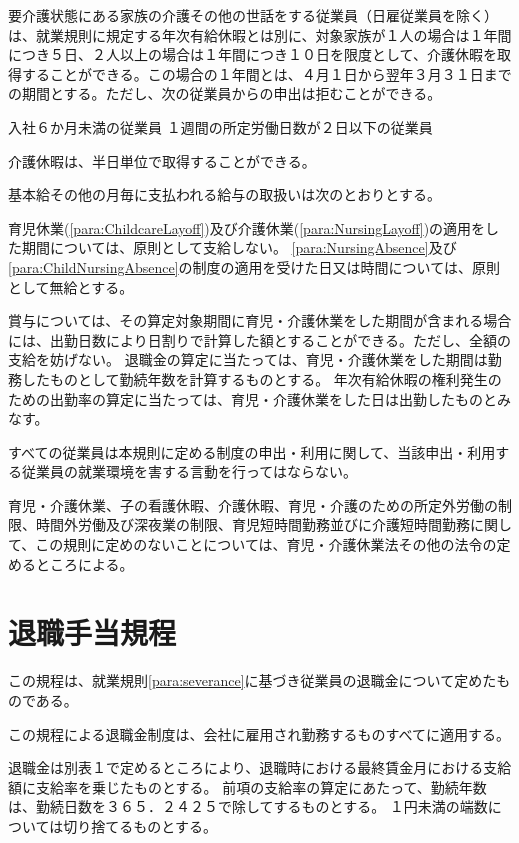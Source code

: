 \documentclass[10pt,a4paper,uplatex]{jsarticle}
\begin{document}
要介護状態にある家族の介護その他の世話をする従業員（日雇従業員を除く）は、就業規則に規定する年次有給休暇とは別に、対象家族が１人の場合は１年間につき５日、２人以上の場合は１年間につき１０日を限度として、介護休暇を取得することができる。この場合の１年間とは、４月１日から翌年３月３１日までの期間とする。ただし、次の従業員からの申出は拒むことができる。
\label{para:NursingAbsence}
\begin{enumerate}
    \itm 入社６か月未満の従業員
    \itm １週間の所定労働日数が２日以下の従業員
\end{enumerate}
\term 介護休暇は、半日単位で取得することができる。

基本給その他の月毎に支払われる給与の取扱いは次のとおりとする。
\begin{enumerate}
    \itm 育児休業(\ref{para:ChildcareLayoff})及び介護休業(\ref{para:NursingLayoff})の適用をした期間については、原則として支給しない。
    \itm \ref{para:NursingAbsence}及び\ref{para:ChildNursingAbsence}の制度の適用を受けた日又は時間については、原則として無給とする。
\end{enumerate}
\term 賞与については、その算定対象期間に育児・介護休業をした期間が含まれる場合には、出勤日数により日割りで計算した額とすることができる。ただし、全額の支給を妨げない。
\term 退職金の算定に当たっては、育児・介護休業をした期間は勤務したものとして勤続年数を計算するものとする。
\term 年次有給休暇の権利発生のための出勤率の算定に当たっては、育児・介護休業をした日は出勤したものとみなす。

すべての従業員は本規則に定める制度の申出・利用に関して、当該申出・利用する従業員の就業環境を害する言動を行ってはならない。

育児・介護休業、子の看護休暇、介護休暇、育児・介護のための所定外労働の制限、時間外労働及び深夜業の制限、育児短時間勤務並びに介護短時間勤務に関して、この規則に定めのないことについては、育児・介護休業法その他の法令の定めるところによる。


\clearpage
\section{退職手当規程}

この規程は、就業規則\ref{para:severance}に基づき従業員の退職金について定めたものである。

この規程による退職金制度は、会社に雇用され勤務するものすべてに適用する。

退職金は別表１で定めるところにより、退職時における最終賃金月における支給額に支給率を乗じたものとする。
\term 前項の支給率の算定にあたって、勤続年数は、勤続日数を３６５．２４２５で除してするものとする。
\term １円未満の端数については切り捨てるものとする。
\end{document}
